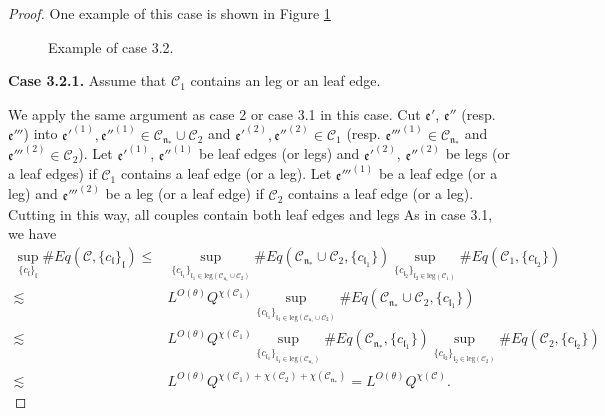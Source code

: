 \begin{proof}
One example of this case is shown in Figure \ref{fig.examplecase3.2}
\begin{figure}[H]
        \caption{Example of case 3.2.}
        \centering
        \label{fig.examplecase3.2}
    \end{figure}
    
\textbf{Case 3.2.1.} Assume that $\mathcal{C}_1$ contains an leg or an leaf edge. 

We apply the same argument as case 2 or case 3.1 in this case. Cut $\mathfrak{e}'$, $\mathfrak{e}''$ (resp. $\mathfrak{e}'''$) into $\mathfrak{e}'^{(1)}, \mathfrak{e}''^{(1)}\in  \mathcal{C}_{\mathfrak{n}_*}\cup \mathcal{C}_2$ and $\mathfrak{e}'^{(2)}, \mathfrak{e}''^{(2)}\in  \mathcal{C}_1$ (resp. $\mathfrak{e}'''^{(1)}\in  \mathcal{C}_{\mathfrak{n}_*}$ and $\mathfrak{e}'''^{(2)}\in  \mathcal{C}_2$). Let $\mathfrak{e}'^{(1)}$, $\mathfrak{e}''^{(1)}$ be leaf edges (or legs) and $\mathfrak{e}'^{(2)}$, $\mathfrak{e}''^{(2)}$ be legs (or a leaf edges) if $\mathcal{C}_1$ contains a leaf edge (or a leg). Let $\mathfrak{e}'''^{(1)}$ be a leaf edge (or a leg) and $\mathfrak{e}'''^{(2)}$ be a leg (or a leaf edge) if $\mathcal{C}_2$ contains a leaf edge (or a leg). Cutting in this way, all couples contain both leaf edges and legs
As in case 3.1, we have
\begin{equation}
\begin{split}
    \sup_{\{c_{\mathfrak{l}}\}_{\mathfrak{l}}}\#Eq(\mathcal{C},\{c_{\mathfrak{l}}\}_{\mathfrak{l}})
    \le&
    \sup_{\{c_{\mathfrak{l}_1}\}_{\mathfrak{l}_1\in \text{leg}(\mathcal{C}_{\mathfrak{n}_*}\cup \mathcal{C}_2)} } \# Eq(\mathcal{C}_{\mathfrak{n}_*}\cup \mathcal{C}_2,\{c_{\mathfrak{l}_1}\}) \sup_{\{c_{\mathfrak{l}_2}\}_{\mathfrak{l}_2\in \text{leg}(\mathcal{C}_1)} }\# Eq(\mathcal{C}_{1}, \{c_{\mathfrak{l}_2}\})
    \\
    \lesssim&  L^{O(\theta)} Q^{\chi(\mathcal{C}_1)}\sup_{\{c_{\mathfrak{l}_1}\}_{\mathfrak{l}_1\in \text{leg}(\mathcal{C}_{\mathfrak{n}_*}\cup \mathcal{C}_2)} } \# Eq(\mathcal{C}_{\mathfrak{n}_*}\cup \mathcal{C}_2,\{c_{\mathfrak{l}_1}\})
    \\
    \lesssim&  L^{O(\theta)} Q^{\chi(\mathcal{C}_1)} \sup_{\{c_{\mathfrak{l}_1}\}_{\mathfrak{l}_1\in \text{leg}(\mathcal{C}_{\mathfrak{n}_*})} } \# Eq(\mathcal{C}_{\mathfrak{n}_*},\{c_{\mathfrak{l}_1}\}) \sup_{\{c_{\mathfrak{l}_2}\}_{\mathfrak{l}_2\in \text{leg}(\mathcal{C}_2)} }\# Eq(\mathcal{C}_{2}, \{c_{\mathfrak{l}_2}\})
    \\
    \lesssim&  L^{O(\theta)} Q^{\chi(\mathcal{C}_1)+\chi(\mathcal{C}_2)+\chi(\mathcal{C}_{\mathfrak{n}_*})}=L^{O(\theta)} Q^{\chi(\mathcal{C})}.
\end{split}
\end{equation}


\end{proof}
